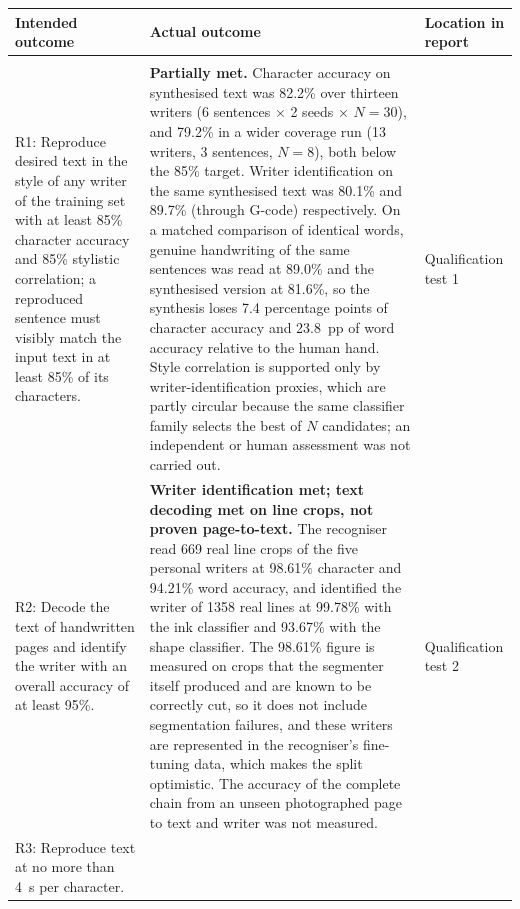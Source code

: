 \begin{table}[h]
\centering
\fontsize{10}{12}\selectfont
\begin{tabularx}{\linewidth}{|>{\raggedright\arraybackslash}p{4.6cm}|>{\raggedright\arraybackslash}X|>{\raggedright\arraybackslash}p{2.3cm}|}
\hline
\textbf{Intended outcome} & \textbf{Actual outcome} & \textbf{Location in report} \\
\hline
\multicolumn{3}{|l|}{\textbf{Core mission requirements and specifications}} \\
\hline
R1: Reproduce desired text in the style of any writer of the training set with at least 85\% character accuracy and 85\% stylistic correlation; a reproduced sentence must visibly match the input text in at least 85\% of its characters. &
\textbf{Partially met.} Character accuracy on synthesised text was 82.2\% over thirteen writers (6 sentences $\times$ 2 seeds $\times$ $N{=}30$), and 79.2\% in a wider coverage run (13 writers, 3 sentences, $N{=}8$), both below the 85\% target. Writer identification on the same synthesised text was 80.1\% and 89.7\% (through G-code) respectively. On a matched comparison of identical words, genuine handwriting of the same sentences was read at 89.0\% and the synthesised version at 81.6\%, so the synthesis loses 7.4 percentage points of character accuracy and 23.8~pp of word accuracy relative to the human hand. Style correlation is supported only by writer-identification proxies, which are partly circular because the same classifier family selects the best of $N$ candidates; an independent or human assessment was not carried out. &
Qualification test 1 \\
\hline
R2: Decode the text of handwritten pages and identify the writer with an overall accuracy of at least 95\%. &
\textbf{Writer identification met; text decoding met on line crops, not proven page-to-text.} The recogniser read 669 real line crops of the five personal writers at 98.61\% character and 94.21\% word accuracy, and identified the writer of 1358 real lines at 99.78\% with the ink classifier and 93.67\% with the shape classifier. The 98.61\% figure is measured on crops that the segmenter itself produced and are known to be correctly cut, so it does not include segmentation failures, and these writers are represented in the recogniser's fine-tuning data, which makes the split optimistic. The accuracy of the complete chain from an unseen photographed page to text and writer was not measured. &
Qualification test 2 \\
\hline
R3: Reproduce text at no more than 4~s per character. &

\end{tabularx}
\end{table}
